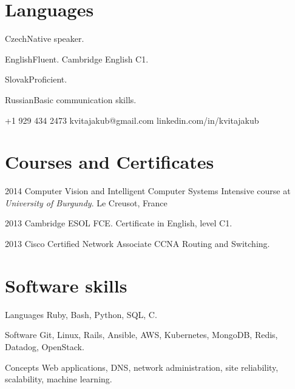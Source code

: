 \documentclass{tccv}
\begin{document}
\section{Languages}

\begin{factlist}
	\item{Czech}{Native speaker.}
	\item{English}{Fluent. Cambridge English C1.}
	\item{Slovak}{Proficient.}
	\item{Russian}{Basic communication skills.}
\end{factlist}

{+1 929 434 2473}
{kvitajakub@gmail.com}
{linkedin.com/in/kvitajakub}

\section{Courses and Certificates}

\begin{yearlist}
	
	\item{2014}
	{Computer Vision and Intelligent Computer Systems}
	{Intensive course at \emph{University of Burgundy}. Le Creusot, France}
	
	\item{2013}
	{Cambridge ESOL FCE.}
	{Certificate in English, level C1.}
	
	\item{2013}
	{Cisco Certified Network Associate}
	{CCNA Routing and Switching.}
	
	
\end{yearlist}

\section{Software skills}

\begin{factlist}
	
	\item{Languages}
	{Ruby, Bash, Python, SQL, C.}
	
	\item{Software}
	{Git, Linux, Rails, Ansible, AWS, Kubernetes, MongoDB, Redis, Datadog, OpenStack.}
	
	\item{Concepts}
	{Web applications, DNS, network administration, site reliability, scalability, machine learning.}
	
\end{factlist}
\end{document}
